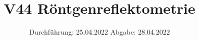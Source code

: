 

\subject{Fortgeschrittenenpraktikum}
\title{V44 Röntgenreflektometrie}
\date{%
  Durchführung: 25.04.2022
  \hspace{3em}
  Abgabe: 28.04.2022
}



\maketitle
\thispagestyle{empty}
\tableofcontents
\newpage








\printbibliography{}




